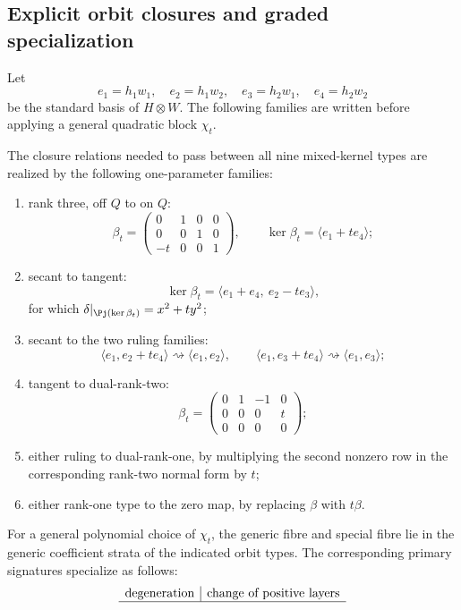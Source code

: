 \subsection{Explicit orbit closures and graded specialization}

Let
\[
 e_1=h_1w_1,\quad e_2=h_1w_2,\quad
 e_3=h_2w_1,\quad e_4=h_2w_2
\]
be the standard basis of \(H\otimes W\).  The following families
are written before applying a general quadratic block \(\chi_t\).

\begin{theorem}
\label{thm:coranktwo-specialization-laws}
The closure relations needed to pass between all nine mixed-kernel
types are realized by the following one-parameter families:
\begin{enumerate}
\item rank three, off \(Q\) to on \(Q\):
\[
 \beta_t=
 \begin{pmatrix}0&1&0&0\\0&0&1&0\\-t&0&0&1\end{pmatrix},
 \qquad \ker\beta_t=\langle e_1+t e_4\rangle;
\]
\item secant to tangent:
\[
 \ker\beta_t=\langle e_1+e_4,\ e_2-t e_3\rangle,
\]
for which \(\delta|_{\Pj(\ker\beta_t)}=x^2+t y^2\);
\item secant to the two ruling families:
\[
 \langle e_1,e_2+t e_4\rangle\rightsquigarrow
 \langle e_1,e_2\rangle,\qquad
 \langle e_1,e_3+t e_4\rangle\rightsquigarrow
 \langle e_1,e_3\rangle;
\]
\item tangent to dual-rank-two:
\[
 \beta_t=
 \begin{pmatrix}0&1&-1&0\\0&0&0&t\\0&0&0&0\end{pmatrix};
\]
\item either ruling to dual-rank-one, by multiplying the second
nonzero row in the corresponding rank-two normal form by \(t\);
\item either rank-one type to the zero map, by replacing
\(\beta\) with \(t\beta\).
\end{enumerate}
For a general polynomial choice of \(\chi_t\), the generic fibre
and special fibre lie in the generic coefficient strata of the
indicated orbit types.  The corresponding primary signatures
specialize as follows:
\[
\begin{array}{l|l}
\text{degeneration}&\text{change of positive layers}\\ \hline

\end{array}\]
\end{theorem}
